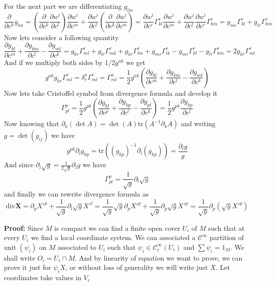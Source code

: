 For the next part we are differentiating $g_{lm}$
\[\frac{\partial}{\partial c^k}g_{lm}=(\frac{\partial}{\partial c^k}\frac{\partial w^i}{\partial c^l})\frac{\partial w^i}{\partial c^m}
+\frac{\partial w^i}{\partial c^l}(\frac{\partial}{\partial c^k}\frac{\partial w^i}{\partial c^m})
=\frac{\partial w^i}{\partial c^r}\Gamma^r_{kl}\frac{\partial w^i}{\partial c^m}+
\frac{\partial w^i}{\partial c^l}\frac{\partial w^i}{\partial c^r}\Gamma^r_{km}
=g_{mr}\Gamma^r_{kl}+g_{lr}\Gamma^r_{km}\]
Now lets consider a following quantity
\[\frac{\partial g_{kl}}{\partial c^m}+\frac{\partial g_{km}}{\partial c^l}-\frac{\partial g_{ml}}{\partial c^k}
=g_{kr}\Gamma^r_{ml}+g_{lr}\Gamma^r_{mk}+g_{kr}\Gamma^r_{lm}+g_{mr}\Gamma^r_{lk}-g_{mr}\Gamma^r_{kl}-g_{lr}\Gamma^r_{km}=2g_{kr}\Gamma^r_{ml}
\]
And if we multiply both sides by $1/2g^{ak}$ we get
\[g^{ak}g_{kr}\Gamma^r_{ml}=\delta_r^a\Gamma^r_{ml}=\Gamma^a_{ml}=\frac{1}{2}g^{ak}(\frac{\partial g_{kl}}{\partial c^m}+\frac{\partial g_{km}}{\partial c^l}-\frac{\partial g_{ml}}{\partial c^k})\]
Now lets take Cristoffel symbol from divergence formula and develop it
\[\Gamma^p_{pl}=\frac{1}{2}g^{pk}(\frac{\partial g_{kl}}{\partial c^p}+\frac{\partial g_{kp}}{\partial c^l}-\frac{\partial g_{pl}}{\partial c^k})
=\frac{1}{2}g^{pk}\frac{\partial g_{kp}}{\partial c^l}\]
Now knowing that $\partial_k(\det A)=\det(A)\text{tr}(A^{-1}\partial_k A)$ and
writing $g=\det(g_{ij})$ we have
\[g^{pk}\partial_l g_{kp}=\text{tr}((g_{kp})^{-1}\partial_l(g_{kp}))=\frac{\partial_l g}{g}\]
And since $\partial_l\sqrt g=\frac{1}{2\sqrt g}\partial_l g$ we have
\[\Gamma^p_{pl}=\frac{1}{\sqrt g}\partial_l\sqrt g\]
and finally we can rewrite divergence formula as
\[\text{div}\mathbf X=\partial_p X'^p+\frac{1}{\sqrt g}\partial_l\sqrt g X'^l
=\frac{1}{\sqrt g}\sqrt g\partial_p X'^p+\frac{1}{\sqrt g}\partial_p\sqrt g X'^p
=\frac{1}{\sqrt g}\partial_p(\sqrt g X'^p)
\]

\vspace{1ex}
\textbf{Proof:}
Since $M$ is compact we can find a finite open cover $U_i$ of
$M$ such that at every $U_i$ we find a local coordinate system. We can associated
a $\mathcal C^\infty$ partition of unit $(\psi_i)$ on $M$ associated to $U_i$ such
that $\psi_i\in\mathcal C^\infty_c(U_i)$ and $\sum\psi_i=1_M$. We shall write
$O_i=U_i\cap M$. And by linearity of equation we want to prove, we can prove it
just for $\psi_iX$, or without loss of generality we will write just $X$. Let
coordinates take values in $V_i$

